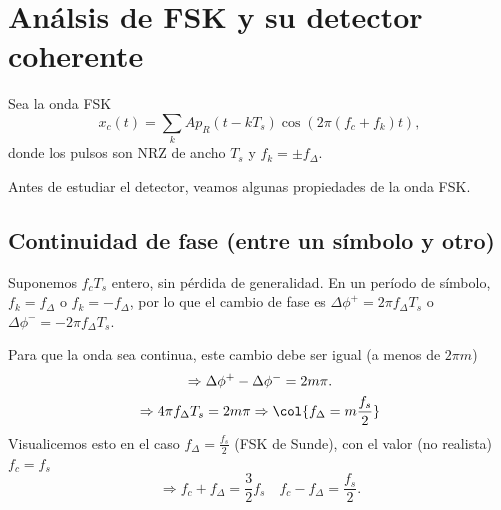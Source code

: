 \section{Análsis de FSK y su detector coherente}

Sea la onda FSK
\[ x_c(t)=\sum_k A p_R(t-kT_s)\cos\left(2\pi(f_c+f_k)t\right),\]
donde los pulsos son NRZ de ancho $T_s$ y $f_k=\pm f_\Delta$.

Antes de estudiar el detector, veamos algunas propiedades de la
onda FSK.

\subsection*{Continuidad de fase (entre un símbolo y otro)}

Suponemos $f_c T_s$ entero, sin pérdida de generalidad.
En un período de símbolo, $f_k=f_\Delta$ o $f_k=-f_\Delta$, por lo que el cambio de fase es $\Delta\phi^+=2\pi f_\Delta T_s$ o $\Delta\phi^-=-2\pi f_\Delta T_s$.

Para que la onda sea continua, este cambio debe ser igual (a menos de $2\pi m$)
    \begin{gather*}
        \Rightarrow \Delta\phi^+ - \Delta\phi^- = 2m\pi.\\
        \Rightarrow 4 \pi f_\Delta T_s = 2 m \pi \Rightarrow \col{f_\Delta = m \frac{f_s}{2}}
    \end{gather*}
    Visualicemos esto en el caso $f_\Delta=\frac{f_s}{2}$ (FSK de Sunde), con el valor (no
    realista) $f_c=f_s$
    \[\Rightarrow  f_c + f_\Delta = \frac{3}{2}f_s \quad f_c - f_{\Delta} =
    \frac{f_s}{2}.\]

        \begin{center}\begin{minipage}{\textwidth}
        \end{minipage}
        \end{center}

